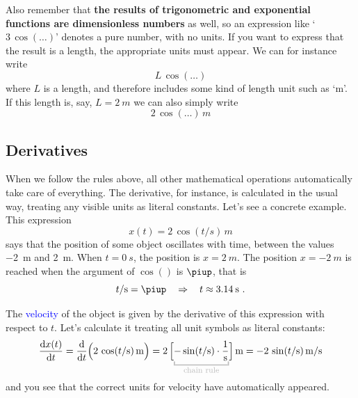 \documentclass[a4paper,12pt,%
onecolumn,oneside,%
british%
]{memoir}
\newcommand*{\pu}{\piup}%
\newcommand*{\di}{\mathop{}\!\mathrm{d}}%
\newcommand*{\limplies}{\mathbin{\Rightarrow}}%
\renewcommand*{\|}[1][]{\nonscript\:#1\vert\nonscript\:\mathopen{}}
\newcommand*{\sect}{\S}%
\newcommand*{\zerob}[1]{\makebox[0pt][c]{#1}}
\renewcommand*{\autoref}[3][\sect\,\ref]{\textcolor{blue}{#3}
\raisebox{0.6ex}{\color{blue}\miniscule%
\faIcon{angle-right}%
\;#1{#2}\;p.\,\pageref{#2}}}
\newcommand*{\dt}{\di t}
\begin{document}
\medskip

Also remember that \textbf{the results of trigonometric and exponential functions are dimensionless numbers} as well, so an expression like \enquote*{$3\,\cos(\dotso)$} denotes a pure number, with no units. If you want to express that the result is a length, the appropriate units must appear. We can for instance write
\begin{equation*}
  L\,\cos(\dotso)
\end{equation*}
where $L$ is a length, and therefore includes some kind of length unit such as \enquote*{\unit{m}}. If this length is, say, $L=\qty{2}{m}$ we can also simply write
\begin{equation*}
  2\,\cos(\dotso)\,\unit{m}
\end{equation*}

\subsection{Derivatives}
\label{sec:units_derivatives}

When we follow the rules above, all other mathematical operations automatically take care of everything. The derivative, for instance, is calculated in the usual way, treating any visible units as literal constants. Let's see a concrete example. This expression
\begin{equation*}
x(t) = 2\,\cos(t/\unit{s})\,\unit{m}
\end{equation*}
says that the position of some object oscillates with time, between the values \qty{-2}{m} and \qty{+2}{m}. When $t=\qty{0}{s}$, the position is $x=\qty{+2}{m}$. The position $x=\qty{-2}{m}$ is reached when the argument of $\cos()$ is $\pu$, that is
\begin{equation*}
  t/\unit{s} = \pu \quad\limplies\quad t\approx \qty{3.14}{s} \ .
\end{equation*}

The \autoref{sec:velocity}{velocity} of the object is given by the derivative of this expression with respect to $t$. Let's calculate it treating all unit symbols as literal constants:
\begin{equation*}
  \frac{\di x(t)}{\dt} = \frac{\di}{\dt}\Bigl(
  2\,\cos(t/\unit{s})\,\unit{m}
  \Bigr)
  =
  2\,\Bigl[
  \mathcolor{grey}{\underbracket{\color{black}-\sin(t/\unit{s})\cdot\frac{1}{\unit{s}}}_{\zerob{\color{grey}\footnotesize chain rule}}}
  \Bigr]\,\unit{m}
  =
 -2\,\sin(t/\unit{s})\,\unit{m/s}
\end{equation*}
and you see that the correct units for velocity have automatically appeared.
\end{document}
